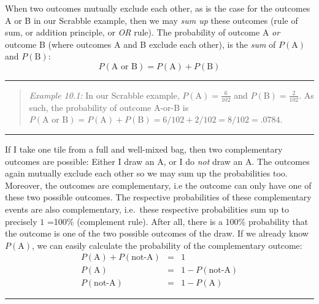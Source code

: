 \documentclass[
]{book}
\begin{document}
When two outcomes mutually exclude each other, as is the case for
the outcomes A or B in our Scrabble example, then we may \emph{sum up}
these outcomes (rule of sum, or addition principle, or \emph{OR} rule).
The probability of outcome A \emph{or}
outcome B (where outcomes A and B exclude each other), is the \emph{sum}
of \(P(\textrm{A})\) and \(P(\textrm{B})\):
\begin{equation}
    P(\textrm{A or B}) = P(\textrm{A}) + P(\textrm{B})
  \label{eq:probability-sumrule}
\end{equation}

\begin{center}\rule{0.5\linewidth}{0.5pt}\end{center}

\begin{quote}
\emph{Example 10.1:}
In our Scrabble example, \(P(\textrm{A})=\frac{6}{102}\) and
\(P(\textrm{B})=\frac{2}{102}\). As such, the probability of outcome A-or-B is
\(P(\textrm{A or B})=P(\textrm{A})+P(\textrm{B})=6/102+2/102=8/102=.0784\).
\end{quote}

\begin{center}\rule{0.5\linewidth}{0.5pt}\end{center}

If I take one tile from a full and well-mixed bag, then two
complementary outcomes are possible: Either I draw an A, or I do \emph{not}
draw an A. The outcomes again mutually exclude each other so we may
sum up the probabilities too. Moreover, the
outcomes are complementary, i.e the outcome can only have one
of these two possible outcomes. The respective probabilities of these
complementary events are also complementary, i.e.~these
respective probabilities sum up to precisely \(1\) =100\% (complement rule).
After all, there is a 100\% probability that the outcome is one of
the two possible outcomes of the draw. If we already know \(P(\textrm{A})\),
we can easily calculate the probability of the complementary
outcome:
\begin{align}
    P(\textrm{A}) + P(\textrm{not-A}) & = & 1\\
    P(\textrm{A}) & = & 1 - P(\textrm{not-A})\\
    P(\textrm{not-A}) & = & 1 - P(\textrm{A})
    \label{eq:complementrule}
\end{align}

\begin{center}\rule{0.5\linewidth}{0.5pt}\end{center}
\end{document}
